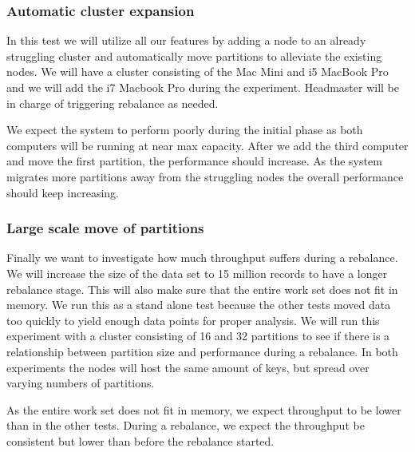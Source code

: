 \subsubsection{Automatic cluster expansion}
In this test we will utilize all our features by adding a node to an already struggling cluster and automatically move partitions to alleviate the existing nodes. We will have a cluster consisting of the Mac Mini and i5 MacBook Pro and we will add the i7 Macbook Pro during the experiment. Headmaster will be in charge of triggering rebalance as needed. 

We expect the system to perform poorly during the initial phase as both computers will be running at near max capacity. After we add the third computer and move the first partition, the performance should increase. As the system migrates more partitions away from the struggling nodes the overall performance should keep increasing.

\subsubsection{Large scale move of partitions}
Finally we want to investigate how much throughput suffers during a rebalance. We will increase the size of the data set to 15 million records to have a longer rebalance stage. This will also make sure that the entire work set does not fit in memory. We run this as a stand alone test because the other tests moved data too quickly to yield enough data points for proper analysis. We will run this experiment with a cluster consisting of 16 and 32 partitions to see if there is a relationship between partition size and performance during a rebalance. In both experiments the nodes will host the same amount of keys, but spread over varying numbers of partitions.

As the entire work set does not fit in memory, we expect throughput to be lower than in the other tests. During a rebalance, we expect the throughput be consistent but lower than before the rebalance started. 



